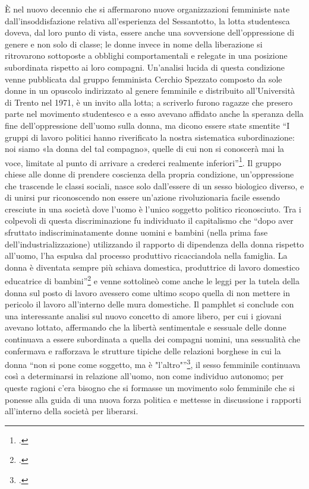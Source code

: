 È nel nuovo decennio che si affermarono nuove organizzazioni femministe nate dall'insoddisfazione relativa all'esperienza del Sessantotto, la lotta studentesca doveva, dal loro punto di vista, essere anche una sovversione dell'oppressione di genere e non solo di classe; le donne invece in nome della liberazione si ritrovarono sottoposte a obblighi comportamentali e relegate in una posizione subordinata rispetto ai loro compagni.
Un'analisi lucida di questa condizione venne pubblicata dal gruppo femminista Cerchio Spezzato composto da sole donne in un opuscolo indirizzato al genere femminile e distribuito all'Università di Trento nel 1971, è un invito alla lotta; a scriverlo furono ragazze che presero parte nel movimento studentesco e a esso avevano affidato anche la speranza della fine dell'oppressione dell'uomo sulla donna, ma dicono essere state smentite \enquote{I gruppi di lavoro politici hanno riverificato la nostra sistematica subordinazione: noi siamo «la donna del tal compagno», quelle di cui non si conoscerà mai la voce, limitate al punto di arrivare a crederci realmente inferiori}\footcite{CerchioSpezzato}.
Il gruppo chiese alle donne di prendere coscienza della propria condizione, un'oppressione che trascende le classi sociali, nasce solo dall'essere di un sesso biologico diverso, e di unirsi pur riconoscendo non essere un'azione rivoluzionaria facile essendo cresciute in una società dove l'uomo è l'unico soggetto politico riconosciuto.
Tra i colpevoli di questa discriminazione fu individuato il capitalismo che \enquote{dopo aver sfruttato indiscriminatamente donne uomini e bambini (nella prima fase dell'industrializzazione) utilizzando il rapporto di dipendenza della donna rispetto all'uomo, l'ha espulsa dal processo produttivo ricacciandola nella famiglia. La donna è diventata sempre più schiava domestica, produttrice di lavoro domestico educatrice di bambini}\footcite{CerchioSpezzato} e venne sottolineò come anche le leggi per la tutela della donna sul posto di lavoro avessero come ultimo scopo quella di non mettere in pericolo il lavoro all'interno delle mura domestiche.
Il pamphlet si conclude con una interessante analisi sul nuovo concetto di amore libero, per cui i giovani avevano lottato, affermando che la libertà sentimentale e sessuale delle donne continuava a essere subordinata a quella dei compagni uomini, una sessualità che confermava e rafforzava le strutture tipiche delle relazioni borghese in cui la donna \enquote{non si pone come soggetto, ma è "l'altro"}\footcite{CerchioSpezzato}, il sesso femminile continuava così a determinarsi in relazione all'uomo, non come individuo autonomo; per queste ragioni c'era bisogno che si formasse un movimento solo femminile che si ponesse alla guida di una nuova forza politica e mettesse in discussione i rapporti all'interno della società per liberarsi.
